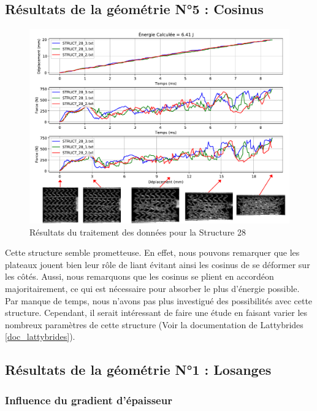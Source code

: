 \documentclass[a4paper]{article}
\begin{document}
	\subsection{Résultats de la géométrie N°5 : Cosinus}
	\begin{figure}[H]
		\centering
		\includegraphics[width=16cm]{Images/7/7_3/STRUCT_28_AVECRUPTURE.pdf}
		\caption{Résultats du traitement des données pour la Structure 28}
	\end{figure}
	
	\hspace{0.5cm}Cette structure semble prometteuse. En effet, nous pouvons remarquer que les plateaux jouent bien leur rôle de liant évitant ainsi les cosinus de se déformer sur les côtés. Aussi, nous remarquons que les cosinus se plient en accordéon majoritairement, ce qui est nécessaire pour absorber le plus d'énergie possible.\\
	
	Par manque de temps, nous n'avons pas plus investigué des possibilités avec cette structure. Cependant, il serait intéressant de faire une étude en faisant varier les nombreux paramètres de cette structure (Voir la documentation de Lattybrides \ref{doc_lattybrides}).
	\newpage
	
	\subsection{Résultats de la géométrie N°1 : Losanges}
	\subsubsection{Influence du gradient d'épaisseur}
	
\end{document}
